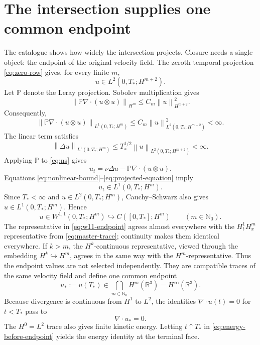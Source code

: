 \documentclass[11pt,letterpaper]{article}
\theoremstyle{definition}
\theoremstyle{remark}
\newcommand{\R}{\mathbb R}
\newcommand{\Nzero}{\mathbb N_0}
\newcommand{\Pdiv}{\mathbb P\nabla\!\cdot}
\newcommand{\norm}[1]{\left\lVert #1\right\rVert}
\begin{document}
\section{The intersection supplies one common endpoint}

The catalogue shows how widely the intersection projects.  Closure needs a
single object: the endpoint of the original velocity field.  The zeroth
temporal projection \eqref{eq:zero-row} gives, for every finite \(m\),
\[
u\in L^2(0,T_*;H^{m+2}).
\]
Let \(\mathbb P\) denote the Leray projection.  Sobolev multiplication gives
\begin{equation}
\norm{\Pdiv(u\otimes u)}_{H^m}
\le C_m\norm{u}_{H^{m+2}}^2.
\label{eq:nonlinear-bound}
\end{equation}
Consequently,
\[
\norm{\Pdiv(u\otimes u)}_{L^1(0,T_*;H^m)}
\le C_m\norm{u}_{L^2(0,T_*;H^{m+2})}^2<\infty.
\]
The linear term satisfies
\[
\norm{\Delta u}_{L^1(0,T_*;H^m)}
\le T_*^{1/2}\norm{u}_{L^2(0,T_*;H^{m+2})}<\infty.
\]
Applying \(\mathbb P\) to \eqref{eq:ns} gives
\begin{equation}
u_t=\nu\Delta u-\Pdiv(u\otimes u).
\label{eq:projected-equation}
\end{equation}
Equations \eqref{eq:nonlinear-bound}--\eqref{eq:projected-equation} imply
\[
u_t\in L^1(0,T_*;H^m).
\]
Since \(T_*<\infty\) and \(u\in L^2(0,T_*;H^m)\), Cauchy--Schwarz also
gives \(u\in L^1(0,T_*;H^m)\).  Hence
\begin{equation}
u\in W^{1,1}(0,T_*;H^m)
\hookrightarrow C([0,T_*];H^m)
\qquad(m\in\Nzero).
\label{eq:w11-endpoint}
\end{equation}
The representative in \eqref{eq:w11-endpoint} agrees almost everywhere
with the \(H^1_tH^m_x\) representative from
\eqref{eq:master-trace}; continuity makes them identical everywhere.
If \(k>m\), the \(H^k\)-continuous representative, viewed through the
embedding \(H^k\hookrightarrow H^m\), agrees in the same way with the
\(H^m\)-representative.  Thus the endpoint values are not selected
independently.  They are compatible traces of the same velocity field and
define one common endpoint
\begin{equation}
\boxed{
u_*:=u(T_*)\in\bigcap_{m\in\Nzero}H^m(\R^3)=H^\infty(\R^3).}
\label{eq:common-endpoint}
\end{equation}
Because divergence is continuous from \(H^1\) to \(L^2\), the identities
\(\nabla\cdot u(t)=0\) for \(t<T_*\) pass to
\[
\nabla\cdot u_*=0.
\]
The \(H^0=L^2\) trace also gives finite kinetic energy.  Letting
\(t\uparrow T_*\) in \eqref{eq:energy-before-endpoint} yields the energy
identity at the terminal face.
\end{document}
